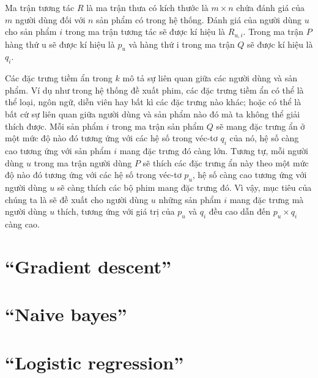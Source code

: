Ma trận tương tác $R$ là ma trận thưa có kích thước là $m \times n$ chứa đánh giá của $m$ người dùng đối với $n$ sản phẩm có trong hệ thống. Đánh giá của người dùng $u$ cho sản phẩm $i$ trong ma trận tương tác sẽ được kí hiệu là $R_{u,i}$. Trong ma trận $P$ hàng thứ u sẽ được kí hiệu là $p_u$ và hàng thứ i trong ma trận $Q$ sẽ được kí hiệu là $q_i$.

Các đặc trưng tiềm ẩn trong $k$ mô tả sự liên quan giữa các người dùng và sản phẩm. Ví dụ như trong hệ thống đề xuất phim, các đặc trưng tiềm ẩn có thể là thể loại, ngôn ngữ, diễn viên hay bất kì các đặc trưng nào khác; hoặc có thể là bất cứ sự liên quan giữa người dùng và sản phẩm nào đó mà ta không thể giải thích được.
Mỗi sản phẩm $i$ trong ma trận sản phẩm $Q$ sẽ mang đặc trưng ẩn ở một mức độ nào đó tương ứng với các hệ số trong véc-tơ $q_i$ của nó, hệ số càng cao tương ứng với sản phẩm $i$ mang đặc trưng đó càng lớn. Tương tự, mỗi người dùng $u$ trong ma trận người dùng $P$ sẽ thích các đặc trưng ẩn này theo một mức độ nào đó tương ứng với các hệ số trong véc-tơ $p_u$, hệ số càng cao tương ứng với người dùng $u$ sẽ càng thích các bộ phim mang đặc trưng đó. Vì vậy, mục tiêu của chúng ta là sẽ đề xuất
cho người dùng $u$ những sản phẩm $i$ mang đặc trưng mà người dùng $u$ thích, tương ứng với giá trị của $p_u$ và $q_i$ đều cao dẫn đến $p_u \times q_i$ càng cao.









\section{``Gradient descent''}


\section{``Naive bayes''}


\section{``Logistic regression''}

